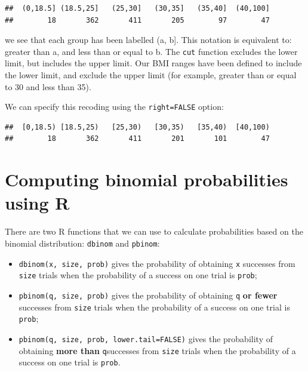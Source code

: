 \documentclass[
]{memoir}
\newenvironment{Shaded}{\begin{snugshade}}{\end{snugshade}}
\newcommand{\AttributeTok}[1]{\textcolor[rgb]{0.77,0.63,0.00}{#1}}
\newcommand{\ConstantTok}[1]{\textcolor[rgb]{0.00,0.00,0.00}{#1}}
\newcommand{\DecValTok}[1]{\textcolor[rgb]{0.00,0.00,0.81}{#1}}
\newcommand{\FloatTok}[1]{\textcolor[rgb]{0.00,0.00,0.81}{#1}}
\newcommand{\FunctionTok}[1]{\textcolor[rgb]{0.00,0.00,0.00}{#1}}
\newcommand{\NormalTok}[1]{#1}
\newcommand{\OtherTok}[1]{\textcolor[rgb]{0.56,0.35,0.01}{#1}}
\newcommand{\SpecialCharTok}[1]{\textcolor[rgb]{0.00,0.00,0.00}{#1}}
\providecommand{\tightlist}{%
  \setlength{\itemsep}{0pt}\setlength{\parskip}{0pt}}
\begin{document}
\begin{verbatim}
##  (0,18.5] (18.5,25]   (25,30]   (30,35]   (35,40]  (40,100] 
##        18       362       411       205        97        47
\end{verbatim}

we see that each group has been labelled (a, b{]}. This notation is equivalent to: greater than a, and less than or equal to b. The \texttt{cut} function excludes the lower limit, but includes the upper limit. Our BMI ranges have been defined to include the lower limit, and exclude the upper limit (for example, greater than or equal to 30 and less than 35).

We can specify this recoding using the \texttt{right=FALSE} option:

\begin{Shaded}
\end{Shaded}

\begin{verbatim}
##  [0,18.5) [18.5,25)   [25,30)   [30,35)   [35,40)  [40,100) 
##        18       362       411       201       101        47
\end{verbatim}

\hypertarget{computing-binomial-probabilities-using-r}{%
\section{Computing binomial probabilities using R}\label{computing-binomial-probabilities-using-r}}

There are two R functions that we can use to calculate probabilities based on the binomial distribution: \texttt{dbinom} and \texttt{pbinom}:

\begin{itemize}
\tightlist
\item
  \texttt{dbinom(x,\ size,\ prob)} gives the probability of obtaining \texttt{x} successes from \texttt{size} trials when the probability of a success on one trial is \texttt{prob};
\item
  \texttt{pbinom(q,\ size,\ prob)} gives the probability of obtaining \texttt{q} \textbf{or fewer} successes from \texttt{size} trials when the probability of a success on one trial is \texttt{prob};
\item
  \texttt{pbinom(q,\ size,\ prob,\ lower.tail=FALSE)} gives the probability of obtaining \textbf{more than} \texttt{q}successes from \texttt{size} trials when the probability of a success on one trial is \texttt{prob}.
\end{itemize}
\end{document}
